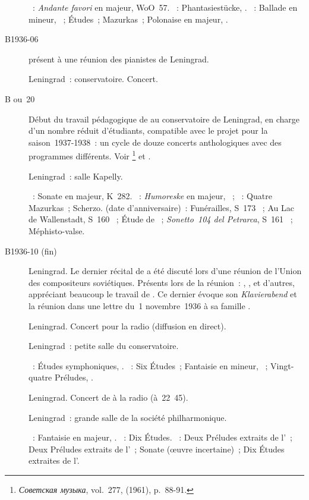 \begin{description}
 \textsc{\Beethoven{}}~: \emph{Andante favori} en \kF majeur, WoO~57.
 \textsc{\Schumann{}}~: Phantasiestücke, .
 \textsc{\Chopin{}}~: Ballade en \kF mineur, ~; Études~; Mazurkas~;
 Polonaise en \kA \Flat majeur, .
 \item[B1936-06]
 \VSofronitsky{} présent à une réunion des pianistes de Leningrad.
 \item[\DateWithWeekDay{1936-10-15}]
 Leningrad~: conservatoire.
 Concert.
 \item[B\DateWithWeekDay{1936-10-15} ou~20]
 Début du travail pédagogique de \VSofronitsky{} au conservatoire de
 Leningrad, en charge d'un nombre réduit d'étudiants, compatible avec le
 projet pour la saison~1937-1938~: un cycle de douze concerts anthologiques
 avec des programmes différents.
 Voir \citet[p.~90-91]{Savshinsky61}%
 \footnote{\foreignlanguage{russian}{\emph{Советская музыка}}, vol.~277,
  (1961), p.~88-91.}
 et \citet[p.~157]{Nekrasova08}.
 \item[\DateWithWeekDay{1936-10-21}]
 Leningrad~: salle Kapelly.

 \textsc{\Mozart{}}~: Sonate en \kE \Flat majeur, K~282.
 \textsc{\Schumann{}}~: \emph{Humoreske} en \kB \Flat majeur, ~;
 \textsc{\Chopin{}}~: Quatre Mazurkas~; Scherzo.
 \textsc{\Liszt{}} (date d'anniversaire)~: Funérailles, S~173 ~;
 Au Lac de Wallenstadt, S~160 ~; Étude de \Paganini{}~;
 \emph{Sonetto~104 del Petrarca}, S~161 ~; Méphisto-valse.
 \item[B1936-10 (fin)]
 Leningrad.
 Le dernier récital de \VSofronitsky{} a été discuté lors d'une réunion de
 l'\hbox{Union} des compositeurs soviétiques.
 Présents lors de la réunion~: \LNikolaiev{}, \NGolubovskaya{}, \IBraudo{}
 et d'autres, appréciant beaucoup le travail de \VSofronitsky{}.
 Ce dernier évoque son \emph{Klavierabend} et la réunion dans une lettre
 du~1\ier{} novembre~1936 à sa famille \citep[p.~16]{Kogan08}.
 \item[\DateWithWeekDay{1936-11-03}]
 Leningrad.
 Concert pour la radio (diffusion en direct).
 \item[\DateWithWeekDay{1936-11-15}]
 Leningrad~: petite salle du conservatoire.

 \textsc{\Schumann{}}~: Études symphoniques, .
 \textsc{\Chopin{}}~: Six Études~; Fantaisie en \kF mineur, ~;
 Vingt-quatre Préludes, .
 \item[\DateWithWeekDay{1936-11-20}]
 Leningrad.
 Concert de \VSofronitsky{} à la radio (à~22~45).
 \item[\DateWithWeekDay{1936-11-26}]
 Leningrad~: grande salle de la société philharmonique.

 \textsc{\Schumann{}}~: Fantaisie en \kC majeur, .
 \textsc{\Chopin{}}~: Dix Études.
 \textsc{\Scriabine{}}~: Deux Préludes extraits de l'~; Deux
 Préludes extraits de l'~; Sonate (œuvre incertaine)~; Dix Études
 extraites de l'.
\end{description}

